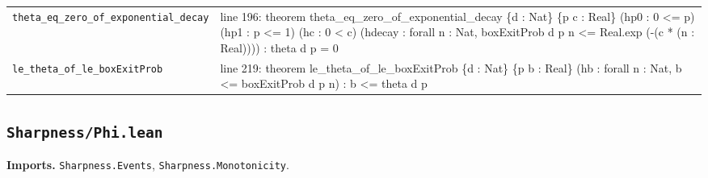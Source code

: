 \documentclass[10pt]{article}
\newcommand{\module}[1]{\texttt{#1}}
\begin{document}
\begin{longtable}{>{\raggedright\arraybackslash}p{} >{\raggedright\arraybackslash}p{}}
\texttt{theta\_\allowbreak{}eq\_\allowbreak{}zero\_\allowbreak{}of\_\allowbreak{}exponential\_\allowbreak{}decay} & {\ttfamily\scriptsize line 196:\allowbreak{} theorem theta\_\allowbreak{}eq\_\allowbreak{}zero\_\allowbreak{}of\_\allowbreak{}exponential\_\allowbreak{}decay \{d :\allowbreak{} Nat\} \{p c :\allowbreak{} Real\} (\allowbreak{}hp0 :\allowbreak{} 0 <=\allowbreak{} p)\allowbreak{} (\allowbreak{}hp1 :\allowbreak{} p <=\allowbreak{} 1)\allowbreak{} (\allowbreak{}hc :\allowbreak{} 0 < c)\allowbreak{} (\allowbreak{}hdecay :\allowbreak{} forall n :\allowbreak{} Nat,\allowbreak{} boxExitProb d p n <=\allowbreak{} Real.\allowbreak{}exp (\allowbreak{}-\allowbreak{}(\allowbreak{}c *\allowbreak{} (\allowbreak{}n :\allowbreak{} Real)\allowbreak{})\allowbreak{})\allowbreak{})\allowbreak{} :\allowbreak{} theta d p =\allowbreak{} 0} \\[0.45em]
\texttt{le\_\allowbreak{}theta\_\allowbreak{}of\_\allowbreak{}le\_\allowbreak{}boxExitProb} & {\ttfamily\scriptsize line 219:\allowbreak{} theorem le\_\allowbreak{}theta\_\allowbreak{}of\_\allowbreak{}le\_\allowbreak{}boxExitProb \{d :\allowbreak{} Nat\} \{p b :\allowbreak{} Real\} (\allowbreak{}hb :\allowbreak{} forall n :\allowbreak{} Nat,\allowbreak{} b <=\allowbreak{} boxExitProb d p n)\allowbreak{} :\allowbreak{} b <=\allowbreak{} theta d p} \\[0.45em]
\end{longtable}

\subsection*{\module{Sharpness/Phi.lean}}
\textbf{Imports.} \module{Sharpness.Events}, \module{Sharpness.Monotonicity}.
\end{document}
